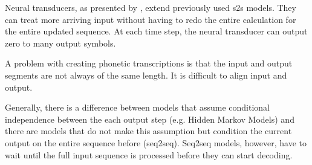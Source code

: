 Neural transducers, as presented by \citet{jaitly2016neural}, extend previously used \ac{s2s} models. They can treat more arriving input without having to redo the entire calculation for the entire updated sequence. At each time step, the neural transducer can output zero to many output symbols. 


A problem with creating phonetic transcriptions is that the input and output segments are not always of the same length. It is difficult to align input and output. 


Generally, there is a difference between models that assume conditional independence between the each output step (e.g. Hidden Markov Models) and there are models that do not make this assumption but condition the current output on the entire sequence before (seq2seq). Seq2seq models, however, have to wait until the full input sequence is processed before they can start decoding.  
